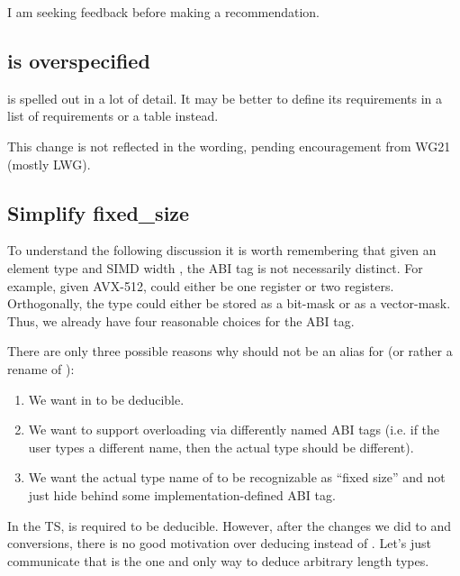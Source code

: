 I am seeking feedback before making a recommendation.

\subsection{ is overspecified}
 is spelled out in a lot of detail.
It may be better to define its requirements in a list of requirements or a table instead.

This change is not reflected in the wording, pending encouragement from WG21 (mostly LWG).

\subsection{Simplify fixed_size}\label{sec:simplifyfixedsize}
To understand the following discussion it is worth remembering that given an
element type  and SIMD width , the ABI tag is not necessarily
distinct.
For example, given AVX-512,  could either be
one  register or two  registers.
Orthogonally, the  type could either be stored as a bit-mask or
as a vector-mask.
Thus, we already have four reasonable choices for the ABI tag.

There are only three possible reasons why \simdabi{} should
not be an alias for \simdabi{} (or rather a rename of
):
\begin{enumerate}
  \item We want  in  to be deducible.

  \item We want to support overloading via differently named ABI tags (i.e. if
    the user types a different name, then the actual type should be different).

  \item We want the actual type name of \simdabi{} to be
    recognizable as ``fixed size'' and not just hide behind some
    implementation-defined ABI tag.
\end{enumerate}

In the TS,  is required to be deducible.
However, after the changes we did to  and conversions, there is
no good motivation over deducing  instead of
.
Let's just communicate that  is the one and only way to
deduce arbitrary length  types.

